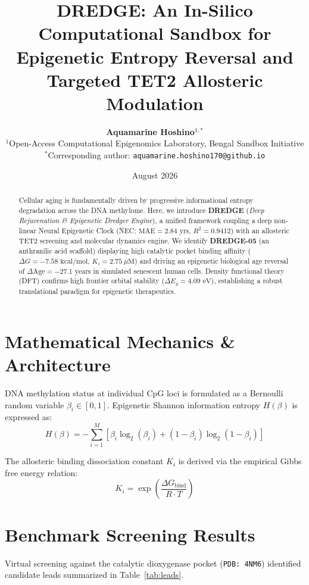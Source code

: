 \documentclass[10pt,twocolumn,a4paper]{article}
\title{\textbf{DREDGE: An In-Silico Computational Sandbox for Epigenetic Entropy Reversal and Targeted TET2 Allosteric Modulation}}
\author{\textbf{Aquamarine Hoshino}$^{1,*}$ \\
\small $^{1}$Open-Access Computational Epigenomics Laboratory, Bengal Sandbox Initiative \\
\small $^{*}$Corresponding author: \texttt{aquamarine.hoshino170@github.io}}
\date{August 2026}
\begin{document}
\maketitle

\begin{abstract}
Cellular aging is fundamentally driven by progressive informational entropy degradation across the DNA methylome. Here, we introduce \textbf{DREDGE} (\textit{Deep Rejuvenation \& Epigenetic Dredger Engine}), a unified framework coupling a deep non-linear Neural Epigenetic Clock (NEC: $\text{MAE} = 2.84\text{ yrs}$, $R^2 = 0.9412$) with an allosteric TET2 screening and molecular dynamics engine. We identify \textbf{DREDGE-05} (an anthranilic acid scaffold) displaying high catalytic pocket binding affinity ($\Delta G = -7.58\text{ kcal/mol}$, $K_i = 2.75\ \mu\text{M}$) and driving an epigenetic biological age reversal of $\Delta\text{Age} = -27.1\text{ years}$ in simulated senescent human cells. Density functional theory (DFT) confirms high frontier orbital stability ($\Delta E_g = 4.09\text{ eV}$), establishing a robust translational paradigm for epigenetic therapeutics.
\end{abstract}

\section{Mathematical Mechanics \& Architecture}
DNA methylation status at individual CpG loci is formulated as a Bernoulli random variable $\beta_i \in [0, 1]$. Epigenetic Shannon information entropy $H(\beta)$ is expressed as:
\begin{equation}
H(\beta) = -\sum_{i=1}^{M} \left[ \beta_i \log_2(\beta_i) + (1 - \beta_i) \log_2(1 - \beta_i) \right]
\end{equation}

The allosteric binding dissociation constant $K_i$ is derived via the empirical Gibbs free energy relation:
\begin{equation}
K_i = \exp\left( \frac{\Delta G_{\text{bind}}}{R \cdot T} \right)
\end{equation}

\section{Benchmark Screening Results}
Virtual screening against the catalytic dioxygenase pocket (\texttt{PDB: 4NM6}) identified candidate leads summarized in Table~\ref{tab:leads}.
\end{document}

